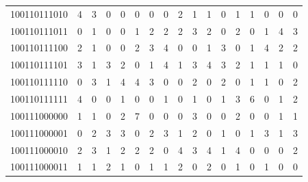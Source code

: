 \documentclass[10pt,a4paper]{article}
\begin{document}
\begin{longtable}{ |c|c|c|c|c|c|c|c|c|c|c|c|c|c|c|c|c| }
    100110111010              & 4                            & 3                                & 0                            & 0                              & 0   & 0   & 0   & 2   & 1   & 1   & 0   & 1   & 1   & 0   & 0   & 0   \\
    100110111011              & 0                            & 1                                & 0                            & 0                              & 1   & 2   & 2   & 2   & 3   & 2   & 0   & 2   & 0   & 1   & 4   & 3   \\
    100110111100              & 2                            & 1                                & 0                            & 0                              & 2   & 3   & 4   & 0   & 0   & 1   & 3   & 0   & 1   & 4   & 2   & 2   \\
    100110111101              & 3                            & 1                                & 3                            & 2                              & 0   & 1   & 4   & 1   & 3   & 4   & 3   & 2   & 1   & 1   & 1   & 0   \\
    100110111110              & 0                            & 3                                & 1                            & 4                              & 4   & 3   & 0   & 0   & 2   & 0   & 2   & 0   & 1   & 1   & 0   & 2   \\
    100110111111              & 4                            & 0                                & 0                            & 1                              & 0   & 0   & 1   & 0   & 1   & 0   & 1   & 3   & 6   & 0   & 1   & 2   \\
    100111000000              & 1                            & 1                                & 0                            & 2                              & 7   & 0   & 0   & 0   & 3   & 0   & 0   & 2   & 0   & 0   & 1   & 1   \\
    100111000001              & 0                            & 2                                & 3                            & 3                              & 0   & 2   & 3   & 1   & 2   & 0   & 1   & 0   & 1   & 3   & 1   & 3   \\
    100111000010              & 2                            & 3                                & 1                            & 2                              & 2   & 2   & 0   & 4   & 3   & 4   & 1   & 4   & 0   & 0   & 0   & 2   \\
    100111000011              & 1                            & 1                                & 2                            & 1                              & 0   & 1   & 1   & 2   & 0   & 2   & 0   & 1   & 0   & 1   & 0   & 0   \\

\end{longtable}
\end{document}
